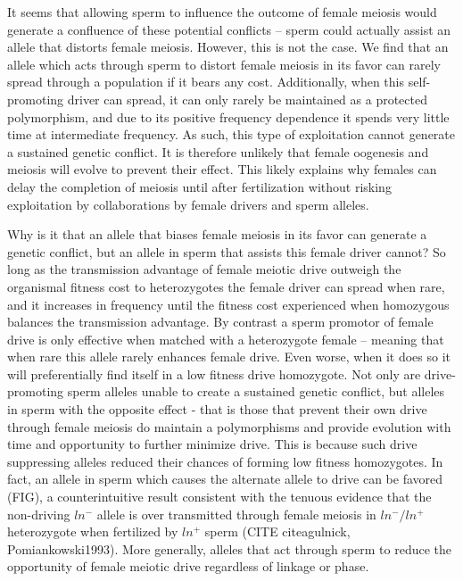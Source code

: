 \documentclass[12pt,letterpaper]{article}
\newcommand{\yb}[1]{{ \color{blue} #1}}
\begin{document}
It seems that allowing sperm to influence the outcome of female meiosis would generate a confluence of these potential conflicts -- 
	sperm could actually assist an allele that distorts female meiosis.
However, this is not the case.
We find that an allele which acts through sperm to distort female meiosis in its favor %
	can rarely spread through a population if it bears any cost. 
Additionally, when this self-promoting driver can spread, it can only rarely 
	be maintained as a protected polymorphism, and due to its positive frequency dependence 
	it spends very little time at intermediate frequency.
As such, this type of exploitation cannot generate a sustained genetic conflict.
It is therefore unlikely
	that female oogenesis and meiosis will evolve to prevent their effect.  
This likely explains why females can delay the completion of meiosis until after fertilization 
	without risking exploitation by collaborations by female
        drivers and sperm alleles.

Why is it that an allele that biases female meiosis in its favor can generate a genetic conflict, but an allele in sperm that assists this female driver cannot? 
So long as the transmission advantage of female meiotic drive outweigh the organismal fitness cost to heterozygotes the female driver can spread when rare, and it increases in 		
	frequency until the fitness cost experienced when homozygous balances the transmission advantage.
By contrast a sperm promotor of female drive is only effective when matched with a heterozygote female -- meaning that when rare this allele rarely enhances female drive. 
Even worse, when it does so it will preferentially find itself in a low fitness drive homozygote. 
Not only are drive-promoting sperm alleles unable to create a sustained genetic conflict, 
	but alleles in sperm with the opposite effect - that is those that prevent their own drive through female meiosis do maintain a polymorphisms and 
	provide evolution  with time and opportunity to further minimize drive.
This is because such drive suppressing alleles reduced their chances
of forming low fitness homozygotes. 
In fact, an allele in sperm which causes the alternate allele to drive can be favored (FIG), a counterintuitive result 
	consistent with the tenuous evidence that the non-driving
        $ln^-$ allele is over transmitted through female meiosis in $ln^-/ln^+$ heterozygote when fertilized by $ln^+$
        sperm (CITE cite{agulnick, Pomiankowski1993}).   
More generally, alleles that act through sperm to
 reduce the opportunity of female meiotic drive regardless of linkage or phase. 
\end{document}
